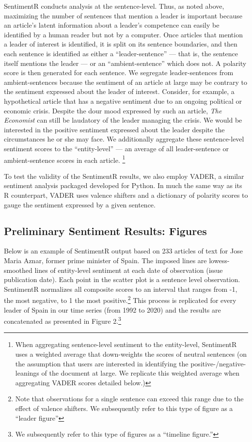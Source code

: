 \documentclass[11pt, letterpaper, twoside]{article}
\begin{document}
SentimentR conducts analysis at the sentence-level. Thus, as noted above, maximizing the number of sentences that mention a leader is important because an article's latent information about a leader's competence can easily be identified by a human reader but not by a computer. Once articles that mention a leader of interest is identified, it is split on its sentence boundaries, and then each sentence is identified as either a ``leader-sentence'' --- that is, the sentence itself mentions the leader --- or an ``ambient-sentence'' which does not. A polarity score is then generated for each sentence. We segregate leader-sentences from ambient-sentences because the sentiment of an article at large may be contrary to the sentiment expressed about the leader of interest. Consider, for example, a hypothetical article that has a negative sentiment due to an ongoing political or economic crisis. Despite the dour mood expressed by such an article, \textit{The Economist} can still be laudatory of the leader managing the crisis. We would be interested in the positive sentiment expressed about the leader despite the circumstances he or she may face.  We additionally aggregate these sentence-level sentiment scores to the ``entity-level'' --- an average of all leader-sentence or ambient-sentence scores in each article. \footnote{When aggregating sentence-level sentiment to the entity-level, SentimentR uses a weighted average that down-weights the scores of neutral sentences (on the assumption that users are interested in identifying the positive-/negative- leanings of the document at large. We replicate this weighted average when aggregating VADER scores detailed below.)} 

To test the validity of the SentimentR results, we also employ VADER, a similar sentiment analysis packaged developed for Python. In much the same way as its R counterpart, VADER uses valence shifters and a dictionary of polarity scores to gauge the sentiment expressed by a given sentence.

\subsection{Preliminary Sentiment Results: Figures}
Below is an example of SentimentR output based on 233 articles of text for Jose Maria Aznar, former prime minister of Spain. The imposed lines are lowess-smoothed lines of entity-level sentiment at each date of observation (issue publication date). Each point in the scatter plot is a sentence level observation. SentimentR normalizes all composite scores to an interval that ranges from -1, the most negative, to 1 the most positive.\footnote{Note that observations for a single sentence can exceed this range due to the effect of valence shifters. We subsequently refer to this type of figure as a ``leader figure''} This process is replicated for every leader of Spain in our time series (from 1992 to 2020) and the results are concatenated as presented in Figure 2.\footnote{We subsequently refer to this type of figures as a ``timeline figure.''}
\end{document}
